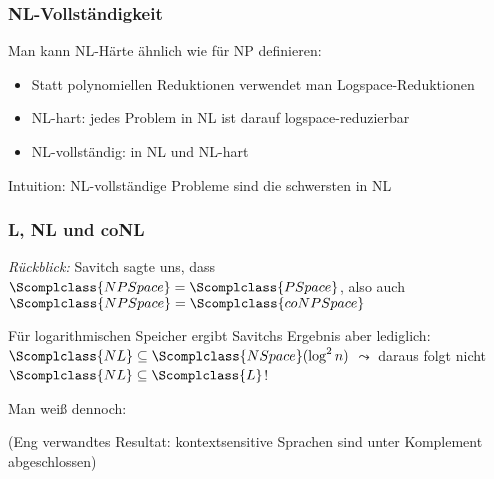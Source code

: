 \documentclass[also={handout}]{beamerswitch}
\begin{document}
\begin{frame}\frametitle{NL-Vollständigkeit}

Man kann NL-Härte ähnlich wie für NP definieren:
\begin{itemize}
\item Statt polynomiellen Reduktionen verwendet man Logspace-Reduktionen
\item NL-hart: jedes Problem in NL ist darauf logspace-reduzierbar
\item NL-vollständig: in NL und NL-hart
\end{itemize}
Intuition: NL-vollständige Probleme sind die schwersten in NL
\bigskip\pause

\bigskip\pause


\end{frame}

\begin{frame}\frametitle{L, NL und coNL}

\emph{Rückblick:} Savitch sagte uns, dass $\Scomplclass{NPSpace}=\Scomplclass{PSpace}$, also auch $\Scomplclass{NPSpace}=\Scomplclass{coNPSpace}$
\bigskip\pause

Für logarithmischen Speicher ergibt Savitchs Ergebnis aber lediglich: $\Scomplclass{NL}\subseteq\Scomplclass{NSpace}(\log^2 n)$
$\leadsto$ daraus folgt nicht $\Scomplclass{NL}\subseteq\Scomplclass{L}$!
\bigskip\pause

Man weiß dennoch:\bigskip

\pause\medskip

\bigskip

{\tiny
(Eng verwandtes Resultat: kontextsensitive Sprachen sind unter Komplement abgeschlossen)

}

\end{frame}

\end{document}
